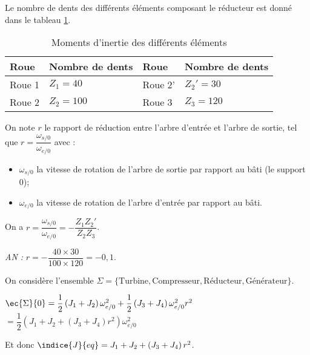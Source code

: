  Le nombre de dents des différents éléments composant le réducteur est donné dans le tableau \ref{tab_94_02}.

\begin{table}[!h]
\begin{tabular}{llll}
\hline
Roue & Nombre de dents & Roue & Nombre de dents\\ \hline
Roue 1 		& $Z_1 = 40$ 	& Roue 2' 	& $Z_2' = 30$ 	\\
Roue 2 		& $Z_2 = 100$ 	& Roue 3	& $Z_3 = 120$ 	\\
 \hline
\end{tabular}
\caption{Moments d’inertie des différents éléments \label{tab_94_02}}
 \end{table}

 On note $r$ le rapport de réduction entre l’arbre d’entrée et l’arbre de sortie, tel que $r = \dfrac{\omega_{s/0}}{\omega_{e/0}}$ avec :
\begin{itemize}
 	\item  $\omega_{s/0}$ la vitesse de rotation de l’arbre de sortie par rapport au bâti (le support 0);
 	\item $\omega_{e/0}$ la vitesse de rotation de l’arbre d'entrée par rapport au bâti.
\end{itemize}

\fi


\ifprof
\begin{corrige}
On a $r = \dfrac{\omega_{s/0}}{\omega_{e/0}} = - \dfrac{Z_1 Z_2'}{Z_2 Z_3} $.

\textit{AN :} $r =  - \dfrac{40 \times 30}{100 \times 120}  = -0,1$.
\end{corrige}

\else
\fi

On considère l’ensemble $\Sigma =\{\text{Turbine}, \text{Compresseur}, \text{Réducteur}, \text{Générateur}\}$.

\ifprof 
\begin{corrige}
$\ec{\Sigma}{0} = \dfrac{1}{2}\left( J_1 + J_2 \right) \omega_{e/0}^2 + \dfrac{1}{2}\left( J_3 + J_4 \right) \omega_{e/0}^2r^2 $
$= \dfrac{1}{2}\left(  J_1 + J_2  + \left( J_3 + J_4 \right)r^2  \right)\omega_{e/0}^2$

Et donc $\indice{J}{eq}= J_1 + J_2  + \left( J_3 + J_4 \right)r^2 $.
\end{corrige}
\else
\fi

